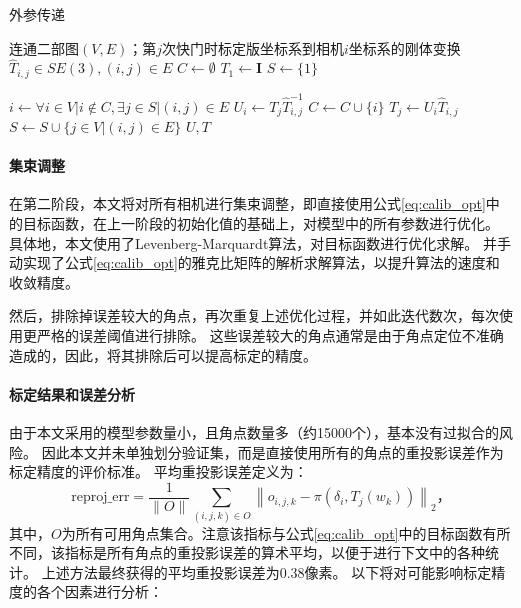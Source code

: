 \begin{algorithm}[t]
    \caption{外参传递}
    \label{alg:calib_init}
    \begin{algorithmic}[1]
        \Require 连通二部图$(V,E)$；第$j$次快门时标定版坐标系到相机$i$坐标系的刚体变换$\hat{T}_{i,j}\in SE(3),(i,j)\in E$
            \State $C \gets \emptyset$
            \State $T_{1} \gets \mathbf{I}$
            \State $S \gets \{1\}$

                \State $i \gets \forall i\in V| i\notin C, \exists j\in S| (i,j)\in E$
                \State $U_{i} \gets T_{j}\hat{T}_{i,j}^{-1}$
                \State $C \gets C \cup \{i\}$
                    \State $T_{j} \gets U_{i}\hat{T}_{i,j}$
                \EndFor
                \State $S \gets S \cup \{j\in V| (i,j)\in E\}$
            \EndWhile
            \State \Return $U, T$
        \EndProcedure
    \end{algorithmic}
\end{algorithm}

\paragraph{集束调整}在第二阶段，本文将对所有相机进行集束调整，即直接使用公式\eqref{eq:calib_opt}中的目标函数，在上一阶段的初始化值的基础上，对模型中的所有参数进行优化。
具体地，本文使用了Levenberg-Marquardt算法\cite{lm}，对目标函数进行优化求解。
并手动实现了公式\eqref{eq:calib_opt}的雅克比矩阵的解析求解算法，以提升算法的速度和收敛精度。

然后，排除掉误差较大的角点，再次重复上述优化过程，并如此迭代数次，每次使用更严格的误差阈值进行排除。
这些误差较大的角点通常是由于角点定位不准确造成的，因此，将其排除后可以提高标定的精度。

\paragraph{标定结果和误差分析}

由于本文采用的模型参数量小，且角点数量多（约15000个），基本没有过拟合的风险。
因此本文并未单独划分验证集，而是直接使用所有的角点的重投影误差作为标定精度的评价标准。
平均重投影误差定义为：
\begin{equation}
    \label{eq:reproj_err}
    \text{reproj\_err} = \frac{1}{\|O\|}\sum_{(i,j,k)\in O}\left\|o_{i,j,k} - \pi\left(\delta_i, T_j(w_k)\right)\right\|_2
    \text{，}
\end{equation}
其中，$O$为所有可用角点集合。注意该指标与公式\eqref{eq:calib_opt}中的目标函数有所不同，该指标是所有角点的重投影误差的算术平均，以便于进行下文中的各种统计。
上述方法最终获得的平均重投影误差为0.38像素。
以下将对可能影响标定精度的各个因素进行分析：

